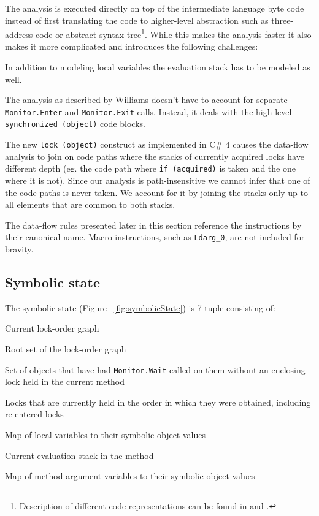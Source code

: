 The analysis is executed directly on top of the intermediate language byte code instead of first translating the code to higher-level abstraction such as three-address code or abstract syntax tree\footnote{Description of different code representations can be found in \citet{Aho1986} and \citet{Muchnick1998}.}. While this makes the analysis faster it also makes it more complicated and introduces the following challenges:
\begin{itemize*}
\item In addition to modeling local variables the evaluation stack has to be modeled as well.
\item The analysis as described by Williams doesn't have to account for separate \texttt{Monitor.Enter} and \texttt{Monitor.Exit} calls. Instead, it deals with the high-level \texttt{synchronized (object)} code blocks.
\item The new \texttt{lock (object)} construct as implemented in C\# 4 causes the data-flow analysis to join on code paths where the stacks of currently acquired locks have different depth (eg. the code path where \texttt{if (acquired)} is taken and the one where it is not). Since our analysis is path-insensitive we cannot infer that one of the code paths is never taken. We account for it by joining the stacks only up to all elements that are common to both stacks. 
\end{itemize*}

The data-flow rules presented later in this section reference the instructions by their canonical name. Macro instructions, such as \texttt{Ldarg\_0}, are not included for bravity.

\subsection{Symbolic state}

The symbolic state (Figure ~\ref{fig:symbolicState}) is 7-tuple consisting of:
\begin{itemize*}
\item Current lock-order graph
\item Root set of the lock-order graph
\item Set of objects that have had \texttt{Monitor.Wait} called on them without an enclosing lock held in the current method
\item Locks that are currently held in the order in which they were obtained, including re-entered locks
\item Map of local variables to their symbolic object values
\item Current evaluation stack in the method
\item Map of method argument variables to their symbolic object values
\end{itemize*}

